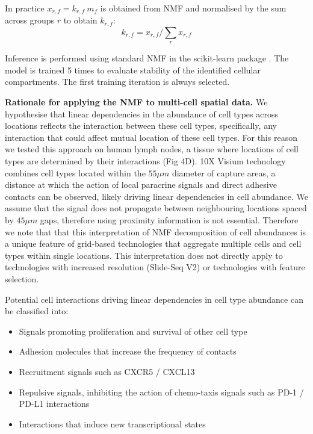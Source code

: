 \documentclass[11pt,a4paper]{article}
\begin{document}
In practice $x_{r,f} = k_{r,f} \: m_{f}$ is obtained from NMF and normalised by the sum across groups $r$ to obtain $k_{r,f}$:
\begin{equation} \label{eq:circ:2}
k_{r,f} = x_{r,f} / \sum_{r} x_{r,f}
\end{equation}

Inference is performed using standard NMF in the scikit-learn package \autocite{pedregosa_scikit-learn_2011}. The model is trained 5 times to evaluate stability of the identified cellular compartments. The first training iteration is always selected. 

\textbf{Rationale for applying the NMF to multi-cell spatial data.} We hypothesise that linear dependencies in the abundance of cell types across locations reflects the interaction between these cell types, specifically, any interaction that could affect mutual location of these cell types. For this reason we tested this approach on human lymph nodes, a tissue where locations of cell types are determined by their interactions (Fig 4D). 10X Visium technology combines cell types located within the $55\mu m$ diameter of capture areas, a distance at which the action of local paracrine signals and direct adhesive contacts can be observed, likely driving linear dependencies in cell abundance. We assume that the signal does not propagate between neighbouring locations spaced by $45\mu m$ gaps, therefore using proximity information is not essential. Therefore we note that that this interpretation of NMF decomposition of cell abundances is a unique feature of grid-based technologies that aggregate multiple cells and cell types within single locations. This interpretation does not directly apply to technologies with increased resolution (Slide-Seq V2) or technologies with feature selection. 

Potential cell interactions driving linear dependencies in cell type abundance can be classified into:
\begin{itemize}
    \item Signals promoting proliferation and survival of other cell type
    \item Adhesion molecules that increase the frequency of contacts 
    \item Recruitment signals such as CXCR5 / CXCL13 \autocite{van_de_pavert_chemokine_2009}
    \item Repulsive signals, inhibiting the action of chemo-taxis signals such as PD-1 / PD-L1 interactions \autocite{shi_pd-1_2018}
    \item Interactions that induce new transcriptional states 
\end{itemize}
\end{document}
